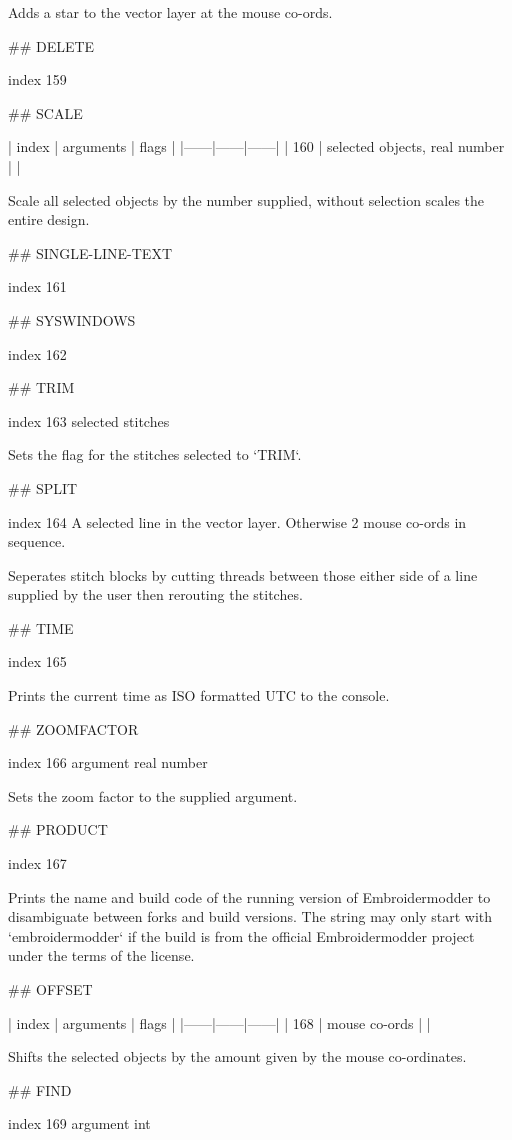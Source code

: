 Adds a star to the vector layer at the mouse co-ords.

## DELETE

index 159



## SCALE

| index | arguments | flags |
|------|------|------|
| 160 | selected objects, real number | |

Scale all selected objects by the number supplied, without selection scales the
entire design.

## SINGLE-LINE-TEXT

index 161



## SYSWINDOWS

index 162


## TRIM

index 163
selected stitches 

Sets the flag for the stitches selected to `TRIM`.

## SPLIT

index 164
A selected line in the vector layer. Otherwise 2 mouse co-ords in sequence.

Seperates stitch blocks by cutting threads between those either side of a line
supplied by the user then rerouting the stitches.

## TIME

index 165

Prints the current time as ISO formatted UTC to the console.

## ZOOMFACTOR

index 166 argument real number

Sets the zoom factor to the supplied argument.

## PRODUCT

index 167

Prints the name and build code of the running version of Embroidermodder to
disambiguate between forks and build versions. The string may only start with
`embroidermodder` if the build is from the official Embroidermodder project
under the terms of the license.

## OFFSET

| index | arguments | flags |
|------|------|------|
| 168 | mouse co-ords | |

Shifts the selected objects by the amount given by the mouse co-ordinates.

## FIND

index 169 argument int

